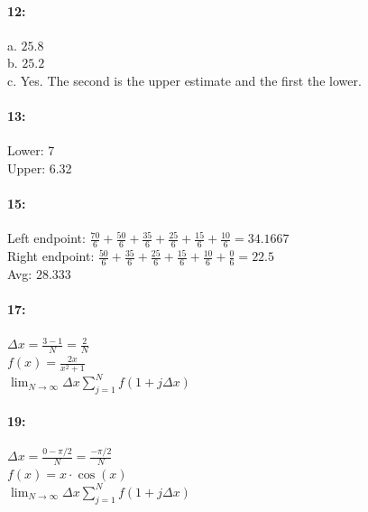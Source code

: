 \documentclass[12pt]{article}
\begin{document}
    \paragraph*{12:\\}
    a. $25.8$\\
    b. $25.2$\\
    c. Yes. The second is the upper estimate and the first the lower.

    \paragraph*{13:\\}
    Lower: 7\\
    Upper: 6.32\\

    \paragraph*{15:\\}
    Left endpoint: $\frac{70}{6} + \frac{50}{6} + \frac{35}{6} + \frac{25}{6} + \frac{15}{6} + \frac{10}{6} = 34.1667$\\
    Right endpoint: $\frac{50}{6} + \frac{35}{6} + \frac{25}{6} + \frac{15}{6} + \frac{10}{6} + \frac{0}{6} = 22.5$\\
    Avg: $28.333$\\

    \paragraph*{17:\\}
    $\Delta x = \frac{3-1}{N} = \frac{2}{N}$\\
    $f(x) = \frac{2x}{x^2 + 1}$\\
    $\lim_{N \to \infty} \Delta x \sum\limits_{j=1}^{N}f(1 + j \Delta x)$\\

    \paragraph*{19:\\}
    $\Delta x = \frac{0-\pi/2}{N} = \frac{-\pi/2}{N}$\\
    $f(x) = x \cdot \cos(x)$ \\
    $\lim_{N \to \infty} \Delta x \sum\limits_{j=1}^{N}f(1 + j \Delta x)$\\


\thispagestyle{fancy}
\end{document}
